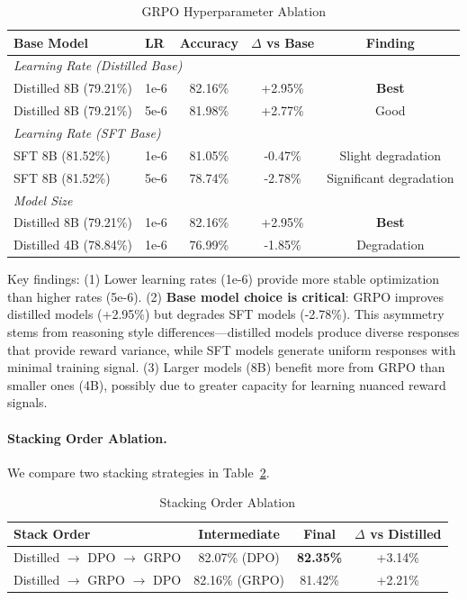 \documentclass[11pt,a4paper]{article}
\begin{document}
\begin{table}[h]
\centering
\caption{GRPO Hyperparameter Ablation}
\label{tab:grpo_ablation}
\begin{tabular}{llccc}
\toprule
\textbf{Base Model} & \textbf{LR} & \textbf{Accuracy} & \textbf{$\Delta$ vs Base} & \textbf{Finding} \\
\midrule
\multicolumn{5}{l}{\textit{Learning Rate (Distilled Base)}} \\
Distilled 8B (79.21\%) & 1e-6 & 82.16\% & +2.95\% & \textbf{Best} \\
Distilled 8B (79.21\%) & 5e-6 & 81.98\% & +2.77\% & Good \\
\midrule
\multicolumn{5}{l}{\textit{Learning Rate (SFT Base)}} \\
SFT 8B (81.52\%) & 1e-6 & 81.05\% & -0.47\% & Slight degradation \\
SFT 8B (81.52\%) & 5e-6 & 78.74\% & -2.78\% & Significant degradation \\
\midrule
\multicolumn{5}{l}{\textit{Model Size}} \\
Distilled 8B (79.21\%) & 1e-6 & 82.16\% & +2.95\% & \textbf{Best} \\
Distilled 4B (78.84\%) & 1e-6 & 76.99\% & -1.85\% & Degradation \\
\bottomrule
\end{tabular}
\end{table}

Key findings: (1) Lower learning rates (1e-6) provide more stable optimization than higher rates (5e-6). (2) \textbf{Base model choice is critical}: GRPO improves distilled models (+2.95\%) but degrades SFT models (-2.78\%). This asymmetry stems from reasoning style differences---distilled models produce diverse responses that provide reward variance, while SFT models generate uniform responses with minimal training signal. (3) Larger models (8B) benefit more from GRPO than smaller ones (4B), possibly due to greater capacity for learning nuanced reward signals.

\paragraph{Stacking Order Ablation.} We compare two stacking strategies in Table~\ref{tab:stacking_ablation}.

\begin{table}[h]
\centering
\caption{Stacking Order Ablation}
\label{tab:stacking_ablation}
\begin{tabular}{lccc}
\toprule
\textbf{Stack Order} & \textbf{Intermediate} & \textbf{Final} & \textbf{$\Delta$ vs Distilled} \\
\midrule
Distilled $\rightarrow$ DPO $\rightarrow$ GRPO & 82.07\% (DPO) & \textbf{82.35\%} & +3.14\% \\
Distilled $\rightarrow$ GRPO $\rightarrow$ DPO & 82.16\% (GRPO) & 81.42\% & +2.21\% \\
\bottomrule
\end{tabular}
\end{table}
\end{document}
